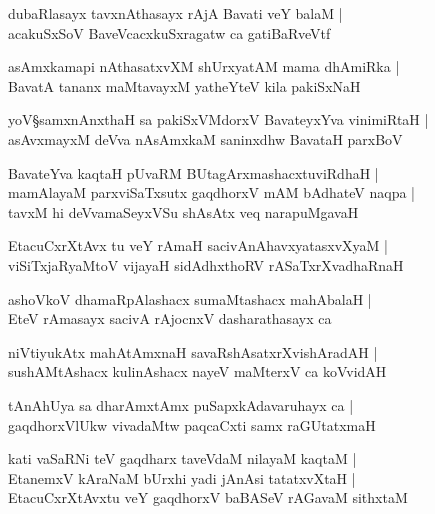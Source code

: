\begin{shloka}
dubaRlasayx tavxnAthasayx rAjA Bavati veY balaM |\\
acakuSxSoV BaveVcacxkuSxragatw ca gatiBaRveVtf 
\end{shloka}

\begin{shloka}
asAmxkamapi nAthasatxvXM shUrxyatAM mama dhAmiRka |\\
BavatA tananx maMtavayxM yatheYteV kila pakiSxNaH 
\end{shloka}

\begin{shloka}
yoV\S samxnAnxthaH sa pakiSxVMdorxV BavateyxYva vinimiRtaH |\\
asAvxmayxM deVva nAsAmxkaM saninxdhw BavataH parxBoV 
\end{shloka}

\begin{shloka}
BavateYva kaqtaH pUvaRM BUtagArxmashacxtuviRdhaH |\\
mamAlayaM parxviSaTxsutx gaqdhorxV mAM bAdhateV naqpa |\\
tavxM hi deVvamaSeyxVSu shAsAtx veq narapuMgavaH 
\end{shloka}

\begin{shloka}
EtacuCxrXtAvx tu veY rAmaH sacivAnAhavxyatasxvXyaM |\\
viSiTxjaRyaMtoV vijayaH sidAdhxthoRV rASaTxrXvadhaRnaH 
\end{shloka}

\begin{shloka}
ashoVkoV dhamaRpAlashacx sumaMtashacx mahAbalaH |\\
EteV rAmasayx sacivA rAjocnxV dasharathasayx ca 
\end{shloka}

\begin{shloka}
niVtiyukAtx mahAtAmxnaH savaRshAsatxrXvishAradAH |\\
sushAMtAshacx kulinAshacx nayeV maMterxV ca koVvidAH
\end{shloka}

\begin{shloka}
tAnAhUya sa dharAmxtAmx puSapxkAdavaruhayx ca |\\
gaqdhorxVlUkw vivadaMtw paqcaCxti samx raGUtatxmaH 
\end{shloka}

\begin{shloka}
kati vaSaRNi teV gaqdharx taveVdaM nilayaM kaqtaM |\\
EtanemxV kAraNaM bUrxhi yadi jAnAsi tatatxvXtaH |\\
EtacuCxrXtAvxtu veY gaqdhorxV baBASeV rAGavaM sithxtaM 
\end{shloka}

